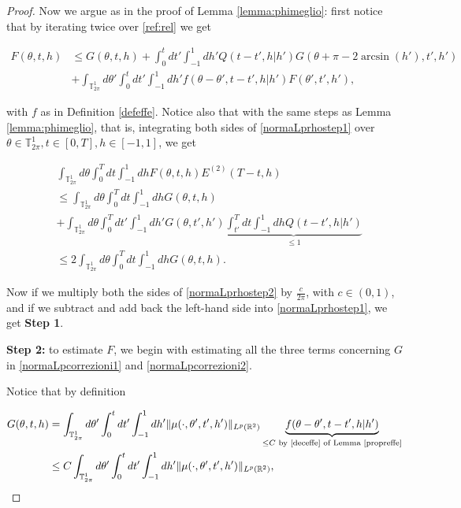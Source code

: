 \documentclass[a4paper,10pt,reqno]{amsart}
\numberwithin{equation}{subsection}
\numberwithin{figure}{subsection}
\begin{document}
\begin{proof}
Now we argue as in the proof of Lemma \ref{lemma:phimeglio}: first notice that by iterating twice over \eqref{ref:rel} we get

\begin{align}
\nonumber F(\theta,t,h)&\leq G(\theta,t,h)+\int_0^tdt'\int_{-1}^1dh' Q(t-t',h|h')G(\theta+\pi-2\arcsin(h'),t',h')
\\
\label{normaLprhostep1}&+\int_{\mathbb{T}^1_{2\pi}}d\theta'\int_0^tdt'\int_{-1}^1dh'f(\theta-\theta',t-t',h|h')F(\theta',t',h'),
\end{align}

with $f$ as in Definition \ref{defeffe}. Notice also that with the same steps as Lemma \ref{lemma:phimeglio}, that is, integrating both sides of \eqref{normaLprhostep1} over $\theta\in\mathbb{T}^1_{2\pi},t\in[0,T],h\in[-1,1]$, we get

\begin{align}
\nonumber&\int_{\mathbb{T}^1_{2\pi}}d\theta\int_0^Tdt\int_{-1}^1dhF(\theta,t,h)E^{(2)}(T-t,h)
\\
\nonumber&\leq\int_{\mathbb{T}^1_{2\pi}}d\theta\int_0^Tdt\int_{-1}^1dhG(\theta,t,h)
\\
\nonumber&+\int_{\mathbb{T}^1_{2\pi}}d\theta\int_0^Tdt'\int_{-1}^1dh'G(\theta,t',h')\underbrace{\int_{t'}^Tdt\int_{-1}^1dhQ(t-t',h|h')}_{\leq1}
\\
\label{normaLprhostep2}&\leq2\int_{\mathbb{T}^1_{2\pi}}d\theta\int_0^Tdt\int_{-1}^1dhG(\theta,t,h).
\end{align}

Now if we multiply both the sides of \eqref{normaLprhostep2} by $\frac{c}{2\pi}$, with $c\in(0,1)$, and if we subtract and add back the left-hand side into \eqref{normaLprhostep1}, we get \textbf{Step 1}.

\textbf{Step 2:} to estimate $F$, we begin with estimating all the three terms concerning $G$ in \eqref{normaLpcorrezioni1} and \eqref{normaLpcorrezioni2}.

Notice that by definition

\begin{align}
\nonumber G(\theta,t,h)&=\int_{\mathbb{T}^1_{2\pi}}d\theta'\int_0^tdt'\int_{-1}^1dh'\|\mu(\cdot,\theta',t',h')\|_{L^p(\mathbb{R}^2)}\underbrace{f(\theta-\theta',t-t',h|h')}_{\leq C\textrm{ by \eqref{deceffe} of Lemma \ref{propreffe}}}
\\
\label{normaLprhostep6}&\leq C\int_{\mathbb{T}^1_{2\pi}}d\theta'\int_0^tdt'\int_{-1}^1dh'\|\mu(\cdot,\theta',t',h')\|_{L^p(\mathbb{R}^2)},
\end{align}


\end{proof}
\end{document}
